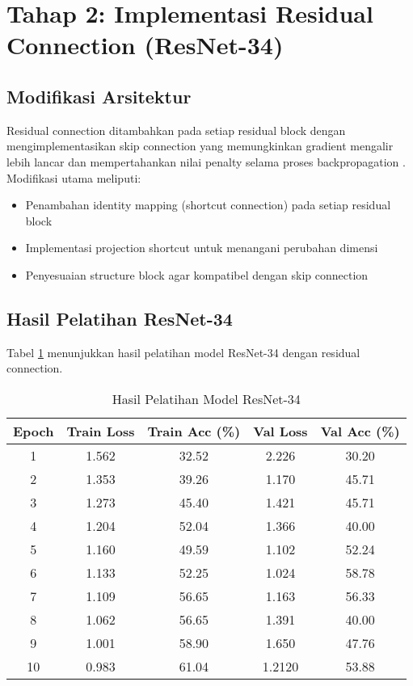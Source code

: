 \documentclass[11pt,a4paper]{article}
\begin{document}
\section{Tahap 2: Implementasi Residual Connection (ResNet-34)}

\subsection{Modifikasi Arsitektur}

Residual connection ditambahkan pada setiap residual block dengan mengimplementasikan skip connection yang memungkinkan gradient mengalir lebih lancar dan mempertahankan nilai penalty selama proses backpropagation . Modifikasi utama meliputi:

\begin{itemize}
    \item Penambahan identity mapping (shortcut connection) pada setiap residual block
    \item Implementasi projection shortcut untuk menangani perubahan dimensi
    \item Penyesuaian structure block agar kompatibel dengan skip connection
\end{itemize}

\subsection{Hasil Pelatihan ResNet-34}

Tabel \ref{tab:resnet34-results} menunjukkan hasil pelatihan model ResNet-34 dengan residual connection.

\begin{table}[H]
\centering
\caption{Hasil Pelatihan Model ResNet-34}
\label{tab:resnet34-results}
\begin{tabular}{ccccc}
\toprule
\textbf{Epoch} & \textbf{Train Loss} & \textbf{Train Acc (\%)} & \textbf{Val Loss} & \textbf{Val Acc (\%)} \\
\midrule
1 & 1.562 & 32.52 & 2.226 & 30.20 \\
2 & 1.353 & 39.26 & 1.170 & 45.71 \\
3 & 1.273 & 45.40 & 1.421 & 45.71\\
4 & 1.204 & 52.04 & 1.366 & 40.00 \\
5 & 1.160 & 49.59 & 1.102 & 52.24 \\
6 & 1.133 & 52.25 & 1.024 & 58.78 \\
7 & 1.109 & 56.65 & 1.163 & 56.33\\
8 & 1.062 & 56.65 & 1.391 & 40.00 \\
9 & 1.001 & 58.90 & 1.650 & 47.76 \\
10 & 0.983 & 61.04 &  1.2120 & 53.88 \\

\bottomrule
\end{tabular}
\end{table}
\end{document}

